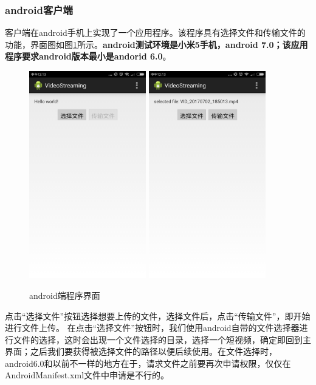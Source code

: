\documentclass[onecolumn]{article}
\begin{document}
\begin{CJK*}{UTF8}{gbsn}
		\subsubsection{android客户端}
		 客户端在android手机上实现了一个应用程序。该程序具有选择文件和传输文件的功能，界面图如图\ref{fig:android}所示。\textbf{android测试环境是小米5手机，android 7.0；该应用程序要求android版本最小是andorid 6.0}。
		 
		 \begin{figure}[h]
		 	\centering
		 	\includegraphics[width=2in]{select.png}
		 	\includegraphics[width=2in]{send.png}
		 	\caption{android端程序界面}
		 	\label{fig:android}
		 \end{figure}
		 
		点击“选择文件”按钮选择想要上传的文件，选择文件后，点击“传输文件”，即开始进行文件上传。
		在点击“选择文件”按钮时，我们使用android自带的文件选择器进行文件的选择，这时会出现一个文件选择的目录，选择一个短视频，确定即回到主界面；之后我们要获得被选择文件的路径以便后续使用。在文件选择时，android6.0和以前不一样的地方在于，请求文件之前要再次申请权限，仅仅在AndroidManifest.xml文件中申请是不行的。
		

\end{CJK*}
\end{document}
